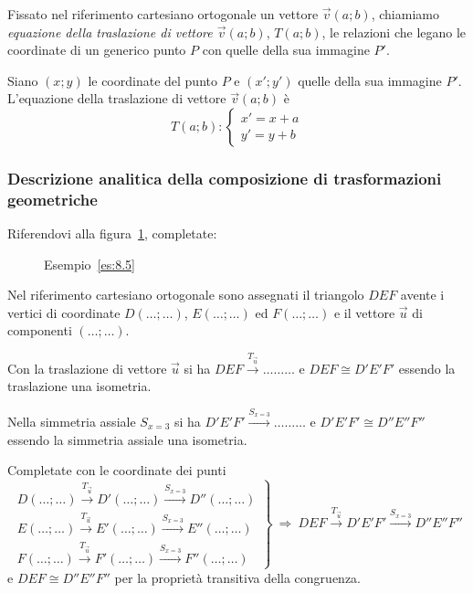 \begin{definizione}
  Fissato nel riferimento cartesiano ortogonale un vettore 
  \(\vec{v}(a;b)\), chiamiamo \emph{equazione della traslazione di 
    vettore \(\vec{v}(a;b)\)}, \(T(a;b)\), le relazioni che legano le 
  coordinate di un generico punto \(P\) con quelle della sua immagine 
  \(P'\).
\end{definizione}

Siano \((x;y)\) le coordinate del punto \(P\) e \((x';y')\) quelle della 
sua immagine \(P'\). L'equazione della traslazione di vettore 
\(\vec{v}(a;b)\) è
\[T(a;b):\begin{cases}x'=x+a\\y'=y+b\end{cases}\]

\subsubsection{Descrizione analitica della composizione di 
trasformazioni geometriche}

\begin{esempio}\label{es:8.5}
Riferendovi alla figura~\ref{fig:es8.5}, completate:


\begin{inaccessibleblock}
\begin{figure}[!htb]
\centering
\caption{Esempio~\ref{es:8.5}}\label{fig:es8.5}
\end{figure}
\end{inaccessibleblock}

Nel riferimento cartesiano ortogonale sono assegnati il triangolo 
\(DEF\) avente i vertici di coordinate \(D(\ldots{};\ldots{})\), 
\(E(\ldots{};\ldots{})\) ed \(F(\ldots{};\ldots{})\) e il vettore 
\(\vec{u}\) di componenti \((\ldots{};\ldots{})\).

Con la traslazione di vettore \(\vec{u}\) si ha \(DEF 
\overset{T_{\vec{u}}}\rightarrow \ldots\ldots\ldots{}\) e \(DEF\cong 
D'E'F'\) essendo la traslazione una isometria.

Nella simmetria assiale \(S_{x=3}\) si ha \(D'E'F' 
\overset{S_{x=3}}\longrightarrow \ldots\ldots\ldots{}\) e \(D'E'F'\cong 
D''E''F''\) essendo la simmetria assiale una isometria.

Completate con le coordinate dei punti
\[\left.\begin{array}{l}D(\ldots{};\ldots{}) 
\overset{T_{\vec{u}}}\rightarrow 
D'(\ldots{};\ldots{})\overset{S_{x=3}}\longrightarrow 
D''(\ldots{};\ldots{})\\
E(\ldots{};\ldots{}) \overset{T_{\vec{u}}}\rightarrow 
E'(\ldots{};\ldots{})\overset{S_{x=3}}\longrightarrow 
E''(\ldots{};\ldots{})\\
F(\ldots{};\ldots{}) \overset{T_{\vec{u}}}\rightarrow 
F'(\ldots{};\ldots{})\overset{S_{x=3}}\longrightarrow 
F''(\ldots{};\ldots{})\end{array} 
\right\}\:\Rightarrow\:DEF\overset{T_{\vec{u}}}\rightarrow 
D'E'F'\overset{S_{x=3}}\longrightarrow D''E''F''\]
e \(DEF\cong D''E''F''\) per la proprietà transitiva della congruenza.
\end{esempio}

